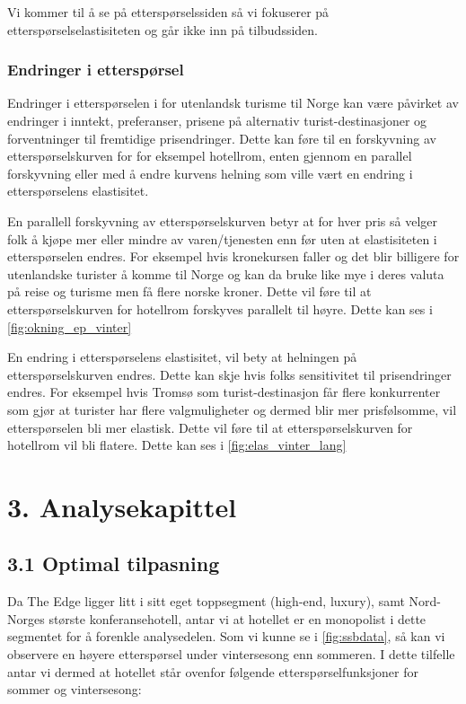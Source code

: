 \documentclass[
  12pt,
  a4paper,
  DIV=11,
  numbers=noendperiod]{scrartcl}
\begin{document}
Vi kommer til å se på etterspørselssiden så vi fokuserer på
etterspørselselastisiteten og går ikke inn på tilbudssiden.

\subsubsection{Endringer i
etterspørsel}\label{endringer-i-etterspuxf8rsel}

Endringer i etterspørselen i for utenlandsk turisme til Norge kan være
påvirket av endringer i inntekt, preferanser, prisene på alternativ
turist-destinasjoner og forventninger til fremtidige prisendringer.
Dette kan føre til en forskyvning av etterspørselskurven for for
eksempel hotellrom, enten gjennom en parallel forskyvning eller med å
endre kurvens helning som ville vært en endring i etterspørselens
elastisitet.

En parallell forskyvning av etterspørselskurven betyr at for hver pris
så velger folk å kjøpe mer eller mindre av varen/tjenesten enn før uten
at elastisiteten i etterspørselen endres. For eksempel hvis kronekursen
faller og det blir billigere for utenlandske turister å komme til Norge
og kan da bruke like mye i deres valuta på reise og turisme men få flere
norske kroner. Dette vil føre til at etterspørselskurven for hotellrom
forskyves parallelt til høyre. Dette kan ses i
\autoref{fig:okning_ep_vinter}

En endring i etterspørselens elastisitet, vil bety at helningen på
etterspørselskurven endres. Dette kan skje hvis folks sensitivitet til
prisendringer endres. For eksempel hvis Tromsø som turist-destinasjon
får flere konkurrenter som gjør at turister har flere valgmuligheter og
dermed blir mer prisfølsomme, vil etterspørselen bli mer elastisk. Dette
vil føre til at etterspørselskurven for hotellrom vil bli flatere. Dette
kan ses i \autoref{fig:elas_vinter_lang}

\clearpage

\section{3. Analysekapittel}\label{analysekapittel}

\subsection{3.1 Optimal tilpasning}\label{optimal-tilpasning}

Da The Edge ligger litt i sitt eget toppsegment (high-end, luxury), samt
Nord-Norges største konferansehotell, antar vi at hotellet er en
monopolist i dette segmentet for å forenkle analysedelen. Som vi kunne
se i \autoref{fig:ssbdata}, så kan vi observere en høyere etterspørsel
under vintersesong enn sommeren. I dette tilfelle antar vi dermed at
hotellet står ovenfor følgende etterspørselfunksjoner for sommer og
vintersesong:
\end{document}
